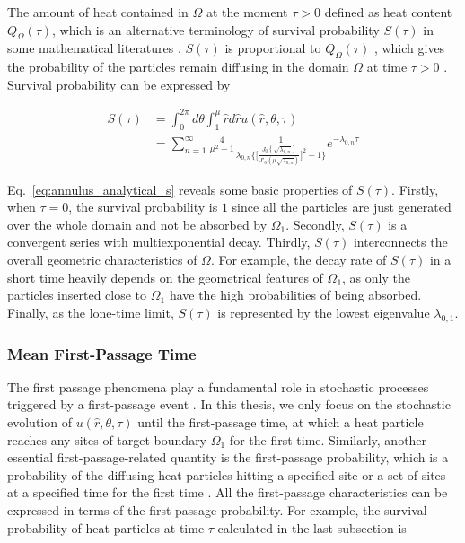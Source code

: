 The amount of heat contained in $\Omega$ at the moment $\tau > 0$
defined as heat content $Q_{\Omega}(\tau)$, which is an alternative
terminology of survival probability $S(\tau)$ in some mathematical
literatures \cite{birkhoff1954note} \cite{van1994heat}
\cite{gilkey1994heat}. $S(\tau)$ is proportional to $Q_{\Omega}(\tau)$
\cite{kalinay2011survival}, which gives the probability of the
particles remain diffusing in the domain $\Omega$ at time $\tau > 0$
\cite{aalen2008survival}. Survival probability can be expressed by

\begin{equation}\label{eq:annulus_analytical_s}
  \begin{split}
    S(\tau) &= \int_{0}^{2\pi} d\theta \int_{1}^{\mu} \hat r d \hat r
    u(\hat r, \theta, \tau)\\ &= \sum_{n=1}^{\infty} \frac{4}{\mu^2 -
      1} \frac{1}{\lambda_{0,n}
      \bigg\{\bigg[\frac{J_0(\sqrt{\lambda_{0,n}})}{J'_0(\mu
          \sqrt{\lambda_{0,n}})}\bigg]^2 -1\bigg\}} e^{-\lambda_{0, n}
      \tau}
  \end{split}
\end{equation}

Eq.~\ref{eq:annulus_analytical_s} reveals some basic properties of
$S(\tau)$. Firstly, when $\tau=0$, the survival probability is $1$
since all the particles are just generated over the whole domain and
not be absorbed by $\Omega_1$. Secondly, $S(\tau)$ is a convergent
series with multiexponential decay. Thirdly, $S(\tau)$ interconnects
the overall geometric characteristics of $\Omega$. For example, the
decay rate of $S(\tau)$ in a short time heavily depends on the
geometrical features of $\Omega_1$, as only the particles inserted
close to $\Omega_1$ have the high probabilities of being
absorbed. Finally, as the lone-time limit, $S(\tau)$ is represented by
the lowest eigenvalue $\lambda_{0,1}$.


\subsubsection{Mean First-Passage Time}

The first passage phenomena play a fundamental role in stochastic
processes triggered by a first-passage event
\cite{van1992stochastic}. In this thesis, we only focus on the
stochastic evolution of $u(\hat r, \theta, \tau)$ until the
first-passage time, at which a heat particle reaches any sites of
target boundary $\Omega_1$ for the first time. Similarly, another
essential first-passage-related quantity is the first-passage
probability, which is a probability of the diffusing heat particles
hitting a specified site or a set of sites at a specified time for the
first time \cite{redner2001guide}. All the first-passage
characteristics can be expressed in terms of the first-passage
probability. For example, the survival probability of heat particles
at time $\tau$ calculated in the last subsection is

